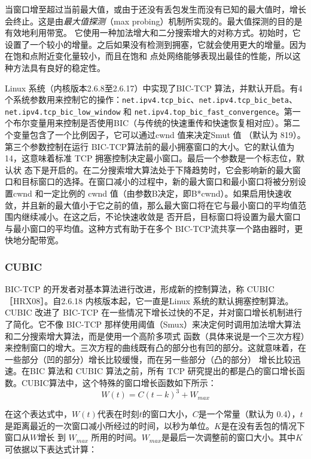 当窗口增至超过当前最大值，或由于还没有丢包发生而没有已知的最大值时，增长会终止。这是由\emph{最大值探测}（max probing）机制所实现的。最大值探测的目的是有效地利用带宽。
它使用一种加法增大和二分搜索增大的对称方式。初始时，它设置了一个较小的增量。之后如果没有检测到拥塞，它就会使用更大的增量。因为在饱和点附近变化量较小，而且在饱和
点处网络能够表现出最佳的性能，所以这种方法具有良好的稳定性。

Linux 系统（内核版本2.6.8至2.6.17）中实现了BIC-TCP 算法，并默认开启。有4个系统参数用来控制它的操作：\verb|net.ipv4.tcp_bic|、\verb|net.ipv4.tcp_bic_beta|、\verb|net.ipv4.tcp_bic_low_window|
和 \verb|net.ipv4.top_bic_fast_convergence|。第一个布尔变量用来控制是否使用BIC（与传统的快速重传和快速恢复相对应）。第二个变量包含了一个比例因子，它可以通过cwnd 值来决定Smut 值
（默认为 819）。第三个参数控制在运行 BIC-TCP算法前的最小拥塞窗口的大小。它的默认值为14，这意味着标准 TCP 拥塞控制决定最小窗口。最后一个参数是一个标志位，默认状
态下是开启的。在二分搜索增大算法处于下降趋势时，它会影响新的最大窗口和目标窗口的选择。在窗口减小的过程中，新的最大窗口和最小窗口将被分别设置cwnd 和一定比例的
cwnd 值（由参数B决定，即B*cwnd）。如果启用快速收敛，并且新的最大值小于它之前的值，那么最大窗口将在它与最小窗口的平均值范围内继续减小。在这之后，不论快速收敛是
否开启，目标窗口将设置为最大窗口与最小窗口的平均值。这种方式有助于在多个 BIC-TCP流共享一个路由器时，更快地分配带宽。

\subsubsection{CUBIC}
BIC-TCP 的开发者对基本算法进行改进，形成新的控制算法，称 CUBIC ［HRX08］。自2.6.18 内核版本起，它一直是Linux 系统的默认拥塞控制算法。CUBIC 改进了 BIC-TCP
在一些情况下增长过快的不足，并对窗口增长机制进行了简化。它不像 BIC-TCP 那样使用阈值（Smux）来决定何时调用加法增大算法和二分搜索增大算法，而是使用一个高阶多项式
函数（具体来说是一个三次方程）来控制窗口的增大。三次方程的曲线既有凸的部分也有凹的部分。这就意味着，在一些部分（凹的部分）增长比较缓慢，而在另一些部分（凸的部分）
增长比较迅速。在BIC 算法和 CUBIC 算法之前，所有 TCP 研究提出的都是凸的窗口增长函数。CUBIC算法中，这个特殊的窗口增长函数如下所示：
\begin{equation}
    W(t) = C(t-k)^3 + W_{max}
\end{equation}

在这个表达式中，$W(t)$代表在时刻$t$的窗口大小，$C$是一个常量（默认为 0.4），$t$是距离最近的一次窗口减小所经过的时间，以秒为单位。$K$是在没有丢包的情况下窗口从$W$增长
到 $W_{max}$ 所用的时间。$W_{max}$是最后一次调整前的窗口大小。其中$K$可依据以下表达式计算：

